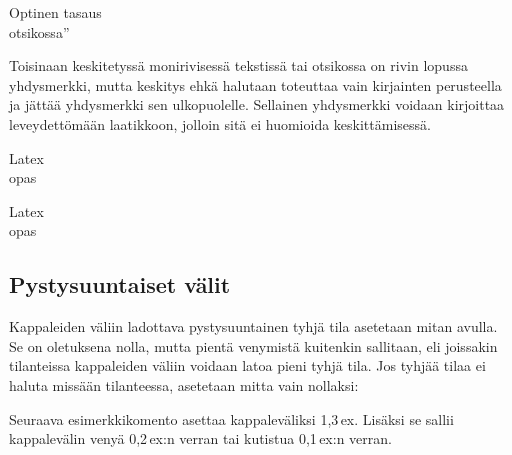 \begin{koodilohkosis}
Optinen tasaus \\
otsikossa''
\end{koodilohkosis}

\noindent
Toisinaan keskitetyssä monirivisessä tekstissä tai otsikossa on rivin
lopussa yhdysmerkki, mutta keskitys ehkä halutaan toteuttaa vain
kirjainten perusteella ja jättää yhdysmerkki sen ulkopuolelle. Sellainen
yhdysmerkki voidaan kirjoittaa leveydettömään laatikkoon, jolloin sitä
ei huomioida keskittämisessä.

\begin{koodilohkosis}
\begin{center}
  \Large Latex\makebox[0bp][l]{-} \\ opas
\end{center}
\end{koodilohkosis}

\begin{tulossis}
  \begin{center}
    \Large Latex\makebox[0bp][l]{-} \\ opas
  \end{center}
\end{tulossis}

\subsection{Pystysuuntaiset välit}
\label{luku/pystysuuntaiset-välit}

Kappaleiden väliin ladottava pystysuuntainen tyhjä tila asetetaan mitan
 avulla. Se on oletuksena nolla, mutta pientä venymistä
kuitenkin sallitaan, eli joissakin tilanteissa kappaleiden väliin
voidaan latoa pieni tyhjä tila. Jos tyhjää tilaa ei haluta missään
tilanteessa, asetetaan mitta vain nollaksi:

\begin{koodilohkosis}
\setlength{\parskip}{0ex}
\end{koodilohkosis}

\noindent
Seuraava esimerkkikomento asettaa kappaleväliksi 1,3\,ex. Lisäksi se
sallii kappalevälin venyä 0,2\,ex:n verran tai kutistua 0,1\,ex:n
verran.

\begin{koodilohkosis}
\setlength{\parskip}{1.3ex plus .2ex minus .1ex}
\end{koodilohkosis}

